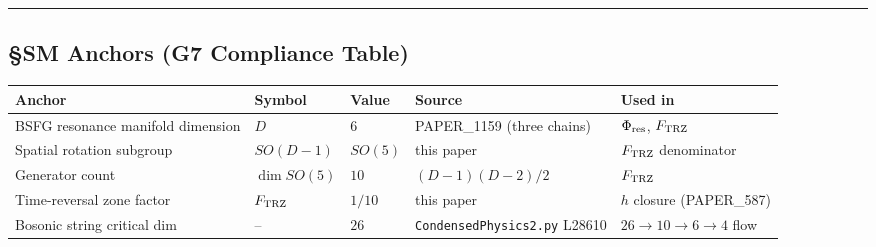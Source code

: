 \documentclass[
]{article}
\newcounter{none} %
\begin{document}
\begin{center}\rule{0.5\linewidth}{0.5pt}\end{center}

\subsection{§SM Anchors (G7 Compliance
Table)}\label{sm-anchors-g7-compliance-table}

{\def\LTcaptype{none} %
\begin{longtable}[]{@{}
  >{\raggedright\arraybackslash}p{}
  >{\raggedright\arraybackslash}p{}
  >{\raggedleft\arraybackslash}p{}
  >{\raggedright\arraybackslash}p{}
  >{\raggedright\arraybackslash}p{}@{}}
\toprule\noalign{}
\begin{minipage}[b]{\linewidth}\raggedright
Anchor
\end{minipage} & \begin{minipage}[b]{\linewidth}\raggedright
Symbol
\end{minipage} & \begin{minipage}[b]{\linewidth}\raggedleft
Value
\end{minipage} & \begin{minipage}[b]{\linewidth}\raggedright
Source
\end{minipage} & \begin{minipage}[b]{\linewidth}\raggedright
Used in
\end{minipage} \\
\midrule\noalign{}
\endhead
\bottomrule\noalign{}
\endlastfoot
BSFG resonance manifold dimension & \(D\) & \(6\) & PAPER\_1159 (three
chains) & \(\Phi_{\rm res}\), \(F_{\rm TRZ}\) \\
Spatial rotation subgroup & \(SO(D-1)\) & \(SO(5)\) & this paper &
\(F_{\rm TRZ}\) denominator \\
Generator count & \(\dim SO(5)\) & \(10\) & \((D-1)(D-2)/2\) &
\(F_{\rm TRZ}\) \\
Time-reversal zone factor & \(F_{\rm TRZ}\) & \(1/10\) & this paper &
\(h\) closure (PAPER\_587) \\
Bosonic string critical dim & -- & \(26\) &
\texttt{CondensedPhysics2.py} L28610 & \(26 \to 10 \to 6 \to 4\) flow \\
\end{longtable}
}
\end{document}

